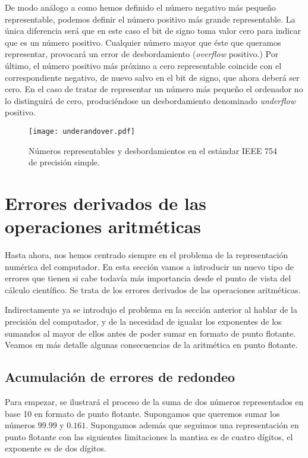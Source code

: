 De modo análogo a como hemos definido el número negativo más pequeño representable, podemos definir el número positivo más grande representable. La única diferencia será que en este caso el bit de signo toma valor cero para indicar que es un  número positivo. Cualquier número mayor que éste que queramos representar, provocará un error de desbordamiento (\emph{overflow} positivo.) Por último, el número positivo más próximo a cero representable coincide con el correspondiente negativo, de nuevo salvo en el bit de signo, que ahora deberá ser cero. En el caso de tratar de representar un número más pequeño el ordenador no lo distinguirá de cero, produciéndose un desbordamiento denominado \emph{underflow} positivo. 
\begin{figure}[h]
	\centering
		\texttt{[image: underandover.pdf]}
	\caption{Números representables y desbordamientos en el estándar IEEE 754 de precisión simple.}	
	\label{fig:desbord}
\end{figure}

\section{Errores derivados de las operaciones aritméticas}
Hasta ahora, nos hemos centrado siempre en el problema de la representación numérica del computador. En esta sección vamos a introducir un nuevo tipo de errores que tienen si cabe todavía más importancia desde el punto de vista del cálculo científico. Se trata de los errores derivados de las operaciones aritméticas.

Indirectamente ya se introdujo el problema en la sección anterior al hablar de la precisión del computador, y de la necesidad de igualar los exponentes de los sumandos al mayor de ellos antes de poder sumar en formato de punto flotante. Veamos en más detalle algunas consecuencias de la aritmética en punto flotante.
\subsection{Acumulación de errores de redondeo}

Para empezar, se ilustrará el proceso de la suma de dos números representados en base 10 en formato de punto flotante. Supongamos que queremos sumar los números $99.99$ y $0.161$. Supongamos además que seguimos una representación en punto flotante con las siguientes limitaciones la mantisa es de cuatro dígitos, el exponente es de dos dígitos.

